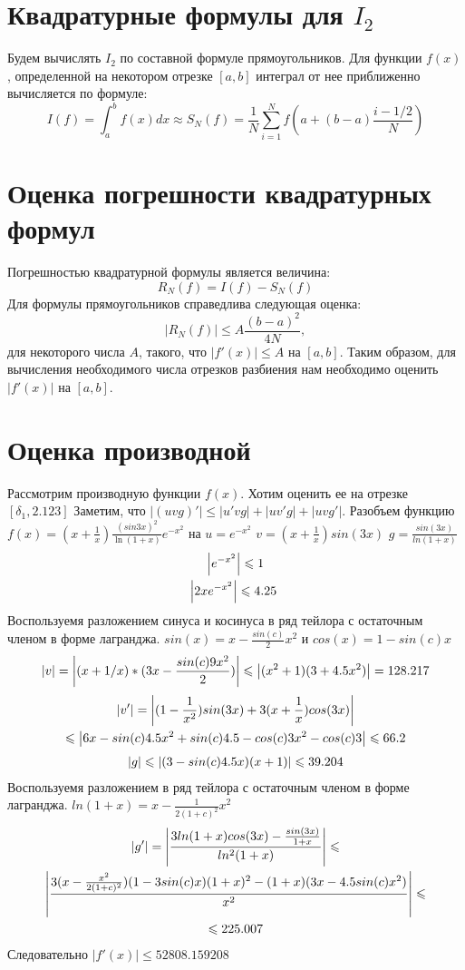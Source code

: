 \documentclass[titlepage]{article}
\def\l{\left}
\def\r{\right}
\def\le{\leqslant}
\begin{document}
\section{Квадратурные формулы для $I_2$}
Будем вычислять $I_2$ по составной формуле прямоугольников. Для функции $f(x)$, определенной на некотором отрезке $[a,b]$ интеграл от нее приближенно вычисляется по формуле:
$$I(f) = \int_{a}^{b}{f(x)dx} \approx S_N(f) = \frac{1}{N}\sum_{i=1}^{N}{f\l(a+(b-a)\frac{i-1/2}{N}\r)}$$
\section{Оценка погрешности квадратурных формул}
Погрешностью квадратурной формулы является величина:
$$R_N(f) = I(f) - S_N(f)$$
Для формулы прямоугольников справедлива следующая оценка:
$$\l|R_N(f)\r| \le A\frac{(b-a)^2}{4N},$$
для некоторого числа $A$, такого, что $\l|f'(x)\r| \le A$ на $[a,b]$. Таким образом, для вычисления необходимого числа отрезков разбиения нам необходимо оценить $\l|f'(x)\r|$ на $[a,b]$.
\section{Оценка производной}
Рассмотрим производную функции $f(x)$.
Хотим оценить ее на отрезке $[\delta_1, 2.123]$
Заметим, что $\l|(uvg)'\r| \le \l|u'vg\r| + \l|uv'g\r| + \l|uvg'\r|$.
Разобъем функцию $f(x) = (x + \frac{1}{x})\frac{(sin{3x})^2}{\ln(1 + x)}e^{-x^2}$ на $u = e^{-x^2}$ $v = 
(x + \frac{1}{x})sin(3x)$ $g = \frac{sin(3x)}{ln(1 + x)}$
\begin{gather}
		\notag \l|e^{-x^2}\r| \le 1 \\
		\l|2xe^{-x^2}\r| \le 4.25
		\
\end{gather}
Воспользуемя разложением синуса и косинуса в ряд тейлора с остаточным членом в форме лагранджа. $sin(x) = x - \frac{sin(c)}{2}x^2$ и $cos(x) = 1 - sin(c)x$
\begin{gather}
	\notag \l|v\r| = \l|(x + 1/x)*(3x - \frac{sin(c)9x^2}{2})\r| \le \l|(x^2 + 1)(3 + 4.5x^2)\r| = 128.217 
\end{gather}
\begin{gather}
	\notag \l|v'\r| =\l|(1 - \frac{1}{x^2})sin(3x) + 3(x + \frac{1}{x})cos(3x)\r| \\ \le \l|6x - sin(c)4.5x^2 + sin(c)4.5 - cos(c)3x^2 -cos(c)3 \r| \le 66.2
\end{gather}
\begin{gather}
	\notag \l|g\r| \le \l|(3 - sin(c)4.5x)(x + 1)\r| \le 39.204
\end{gather}
Воспользуемя разложением в ряд тейлора с остаточным членом в форме лагранджа.
$ln(1 + x) = x - \frac{1}{2(1 + c)^2}x^2$
\begin{gather}
	\notag \l|g'\r| = \l|\frac{3ln(1 + x)cos(3x) - \frac{sin(3x)}{1 + x}}{ln^2{(1 + x)}}\r| \le\\ \l|\frac{3(x - \frac{x^2}{2(1 + c)^2})(1 - 3sin(c)x)(1 + x)^2 - (1 + x)(3x - 4.5sin(c)x^2)}{x^2}\r| \le \\ \le 225.007
\end{gather}
Следовательно $|f'(x)| \le 52808.159208 $ 
\end{document}
